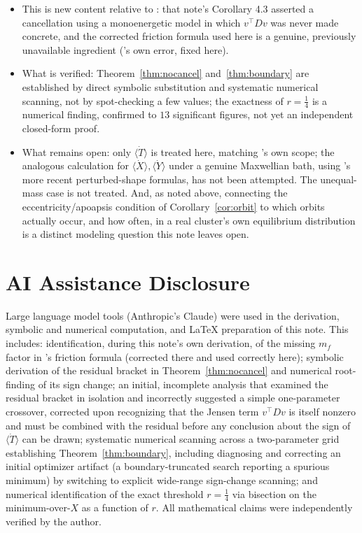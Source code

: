 \documentclass[12pt]{amsart}
\theoremstyle{plain}
\theoremstyle{remark}
\begin{document}
\begin{itemize}
\item[--] This is new content relative to \cite{Ebert2026Bath}: that note's Corollary 4.3 asserted a cancellation using a monoenergetic model in which $v^\top Dv$ was never made concrete, and the corrected friction formula used here is a genuine, previously unavailable ingredient (\cite{Ebert2026Rosenbluth}'s own error, fixed here).
\item[--] What is verified: Theorem~\ref{thm:nocancel} and~\ref{thm:boundary} are established by direct symbolic substitution and systematic numerical scanning, not by spot-checking a few values; the exactness of $r=\tfrac14$ is a numerical finding, confirmed to $13$ significant figures, not yet an independent closed-form proof.
\item[--] What remains open: only $\langle\dot T\rangle$ is treated here, matching \cite{Ebert2026Bath}'s own scope; the analogous calculation for $\langle\dot X\rangle,\langle\dot Y\rangle$ under a genuine Maxwellian bath, using \cite{Ebert2026LeviCivita}'s more recent perturbed-shape formulas, has not been attempted. The unequal-mass case is not treated. And, as noted above, connecting the eccentricity/apoapsis condition of Corollary~\ref{cor:orbit} to which orbits actually occur, and how often, in a real cluster's own equilibrium distribution is a distinct modeling question this note leaves open.
\end{itemize}

\section*{AI Assistance Disclosure}

Large language model tools (Anthropic's Claude) were used in the derivation, symbolic and numerical computation, and \LaTeX{} preparation of this note. This includes: identification, during this note's own derivation, of the missing $m_f$ factor in \cite{Ebert2026Rosenbluth}'s friction formula (corrected there and used correctly here); symbolic derivation of the residual bracket in Theorem~\ref{thm:nocancel} and numerical root-finding of its sign change; an initial, incomplete analysis that examined the residual bracket in isolation and incorrectly suggested a simple one-parameter crossover, corrected upon recognizing that the Jensen term $v^\top Dv$ is itself nonzero and must be combined with the residual before any conclusion about the sign of $\langle\dot T\rangle$ can be drawn; systematic numerical scanning across a two-parameter grid establishing Theorem~\ref{thm:boundary}, including diagnosing and correcting an initial optimizer artifact (a boundary-truncated search reporting a spurious minimum) by switching to explicit wide-range sign-change scanning; and numerical identification of the exact threshold $r=\tfrac14$ via bisection on the minimum-over-$X$ as a function of $r$. All mathematical claims were independently verified by the author.
\end{document}

